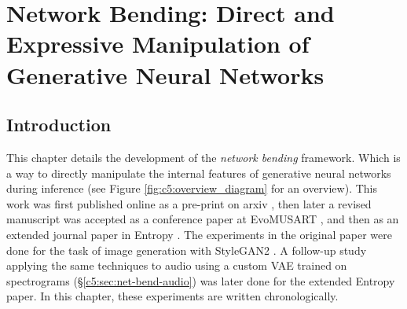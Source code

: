 \chapter{Network Bending: Direct and Expressive Manipulation of Generative Neural Networks}
\label{ch:net_bend}

\section{Introduction}

This chapter details the development of the \textit{network bending} framework. Which is a way to directly manipulate the internal features of generative neural networks during inference (see Figure \ref{fig:c5:overview_diagram} for an overview). This work was first published online as a pre-print on arxiv \citep{broad2020network}, then later a revised manuscript was accepted as a conference paper at EvoMUSART \citep{broad2021network}, and then as an extended journal paper in Entropy \citep{broad2022network}.
The experiments in the original paper were done for the task of image generation with StyleGAN2 \citep{karras2019analyzing}. 
A follow-up study applying the same techniques to audio using a custom VAE trained on spectrograms (\S \ref{c5:sec:net-bend-audio}) was later done for the extended Entropy paper. 
In this chapter, these experiments are written chronologically.


